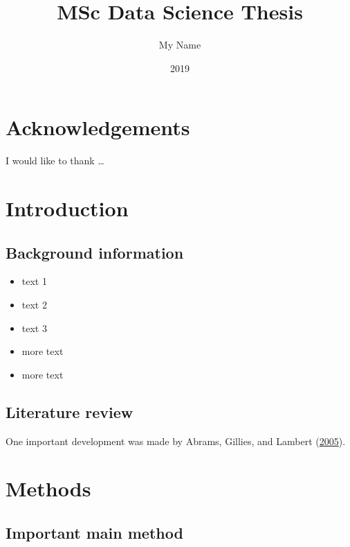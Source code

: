 \documentclass[]{book}
\title{MSc Data Science Thesis}
\author{My Name}
\date{2019}
\providecommand{\tightlist}{%
  \setlength{\itemsep}{0pt}\setlength{\parskip}{0pt}}
\begin{document}
\maketitle

\thispagestyle{empty}

{
\setcounter{tocdepth}{1}
\tableofcontents
}
\listoftables
\listoffigures
\hypertarget{acknowledgements}{%
\chapter*{Acknowledgements}\label{acknowledgements}}

I would like to thank \ldots{}

\mainmatter

\hypertarget{introduction}{%
\chapter{Introduction}\label{introduction}}

\hypertarget{background-information}{%
\section{Background information}\label{background-information}}

\begin{itemize}
\tightlist
\item
  text 1
\item
  text 2
\item
  text 3
\item
  more text
\item
  more text
\end{itemize}

\hypertarget{literature-review}{%
\section{Literature review}\label{literature-review}}

One important development was made by Abrams, Gillies, and Lambert (\protect\hyperlink{ref-Abrams2005}{2005}).

\hypertarget{methods}{%
\chapter{Methods}\label{methods}}

\hypertarget{important-main-method}{%
\section{Important main method}\label{important-main-method}}
\end{document}

